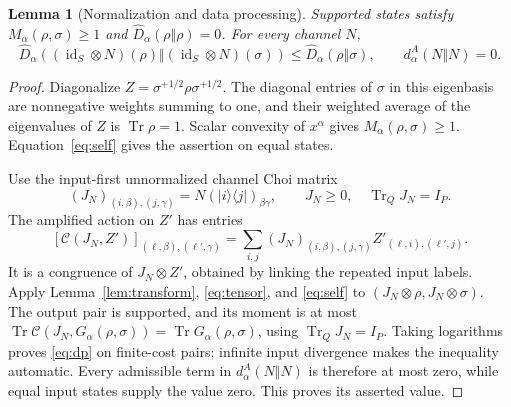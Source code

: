 \documentclass[11pt]{article}
\newcommand{\Tr}{\operatorname{Tr}}
\newcommand{\id}{\operatorname{id}}
\newcommand{\Dhat}{\widehat D}
\newcommand{\G}{G_\alpha}
\newcommand{\M}{M_\alpha}
\newcommand{\ket}[1]{\lvert #1\rangle}
\newcommand{\bra}[1]{\langle #1\rvert}
\newtheorem{lemma}[theorem]{Lemma}
\theoremstyle{remark}
\begin{document}
\begin{lemma}[Normalization and data processing]\label{lem:dp}
Supported states satisfy $\M(\rho,\sigma)\geq1$ and
$\Dhat_\alpha(\rho\Vert\rho)=0$. For every channel $N$,
\begin{equation}\label{eq:dp}
 \Dhat_\alpha((\id_S\otimes N)(\rho)\Vert(\id_S\otimes N)(\sigma))
 \leq\Dhat_\alpha(\rho\Vert\sigma),\qquad d^A_\alpha(N\Vert N)=0.
\end{equation}
\end{lemma}
\begin{proof}
Diagonalize $Z=\sigma^{+1/2}\rho\sigma^{+1/2}$. The diagonal entries of
$\sigma$ in this eigenbasis are nonnegative weights summing to one, and
their weighted average of the eigenvalues of $Z$ is $\Tr\rho=1$.
Scalar convexity of $x^\alpha$ gives $\M(\rho,\sigma)\geq1$.
Equation~\eqref{eq:self} gives the assertion on equal states.

Use the input-first unnormalized channel Choi matrix
\begin{equation}\label{eq:choi}
 (J_N)_{(i,\beta),(j,\gamma)}=N(\ket{i}\bra{j})_{\beta\gamma},
 \qquad J_N\geq0,\quad\Tr_QJ_N=I_P.
\end{equation}
The amplified action on $Z'$ has entries
\[
 [\mathcal C(J_N,Z')]_{(\ell,\beta),(\ell',\gamma)}
 =\sum_{i,j}(J_N)_{(i,\beta),(j,\gamma)}Z'_{(\ell,i),(\ell',j)}.
\]
It is a congruence of $J_N\otimes Z'$, obtained by linking the repeated
input labels. Apply Lemma~\ref{lem:transform}, \eqref{eq:tensor}, and
\eqref{eq:self} to $(J_N\otimes\rho,J_N\otimes\sigma)$. The output pair is
supported, and its moment is at most
$\Tr\mathcal C(J_N,\G(\rho,\sigma))=\Tr\G(\rho,\sigma)$, using
$\Tr_QJ_N=I_P$. Taking logarithms proves \eqref{eq:dp} on finite-cost
pairs; infinite input divergence makes the inequality automatic. Every
admissible term in $d^A_\alpha(N\Vert N)$ is therefore at most zero, while
equal input states supply the value zero. This proves its asserted value.
\end{proof}
\end{document}
